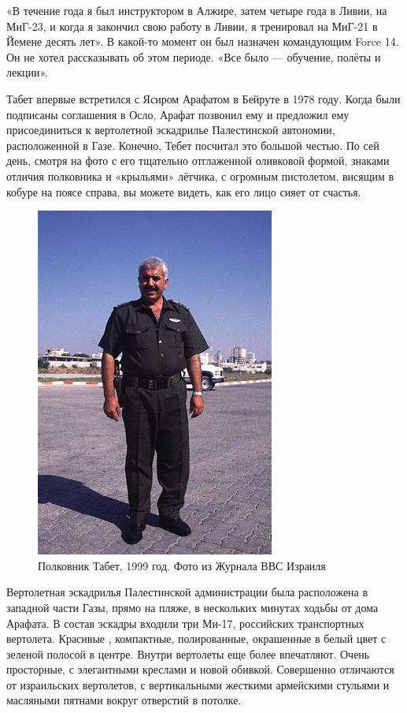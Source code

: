 «В течение года я был инструктором в Алжире, затем четыре года в Ливии, на МиГ-23, и когда я закончил свою работу в Ливии, я тренировал на МиГ-21 в Йемене десять лет». В какой-то момент он был назначен командующим Force 14. Он не хотел рассказывать об этом периоде. «Все было — обучение, полёты и лекции».

Табет впервые встретился с Ясиром Арафатом в Бейруте в 1978 году. Когда были подписаны соглашения в Осло, Арафат позвонил ему и предложил ему присоединиться к вертолетной эскадрилье Палестинской автономии, расположенной в Газе. Конечно, Тебет посчитал это большой честью. По сей день, смотря на фото с его тщательно отглаженной оливковой формой, знаками отличия полковника и «крыльями» лётчика, с огромным пистолетом, висящим в кобуре на поясе справа, вы можете видеть, как его лицо сияет от счастья. 

\begin{figure}[h!tb] 
	\centering\includegraphics[scale=0.8]{History_Tabett/uwRpBNzkdFk.jpg}
	\caption{Полковник Табет, 1999 год. Фото из Журнала ВВС Израиля}%
\end{figure}

Вертолетная эскадрилья Палестинской администрации была расположена в западной части Газы, прямо на пляже, в нескольких минутах ходьбы от дома Арафата. В состав эскадры входили три Ми-17, российских транспортных вертолета. Красивые , компактные, полированные, окрашенные в белый цвет с зеленой полосой в центре. Внутри вертолеты еще более впечатляют. Очень просторные, с элегантными креслами и новой обивкой. Совершенно отличаются от израильских вертолетов, с вертикальными жесткими армейскими стульями и масляными пятнами вокруг отверстий в потолке.

